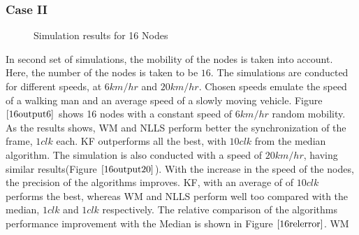 \documentclass[journal]{IEEEtran}
\begin{document}
\subsubsection{\textbf{Case II}}
\begin{figure}
\centerline{
 \hfil {}} \caption{Simulation results for 16 Nodes}
\label{16output}
\end{figure}
In second set of simulations, the mobility of the nodes is taken
into account. Here, the number of the nodes is taken to be $16$. The
simulations are conducted for different speeds, at $6km/hr$ and
$20km/hr$. Chosen speeds emulate the speed of a walking man and an
average speed of a slowly moving vehicle. \newline Figure
$\ref{16output6}$ shows 16 nodes with a constant speed of $6km/hr$
random mobility. As the results shows, WM and NLLS perform better
the synchronization of the frame, $1 clk$ each. KF outperforms all
the best, with $10 clk$ from the median algorithm. \newline The
simulation is also conducted with a speed of $20km/hr$, having
similar results(Figure $\ref{16output20}$). With the increase in the
speed of the nodes, the precision of the algorithms improves. KF,
with an average of of $10 clk$ performs the best, whereas WM and
NLLS perform well too compared with the median, $1 clk$ and $1 clk$
respectively. The relative comparison of the algorithms performance
improvement with the Median is shown in Figure $\ref{16relerror}$. WM
\end{document}
